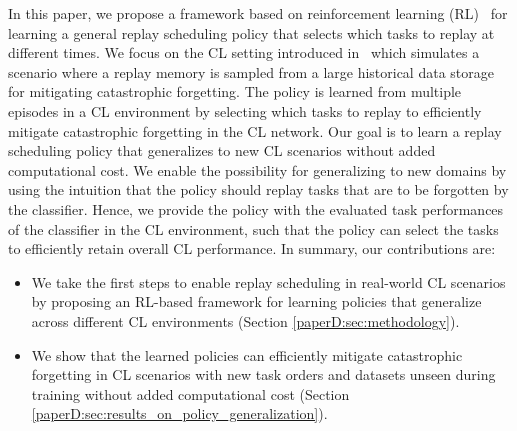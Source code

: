 In this paper, we propose a framework based on reinforcement learning (RL)~ for learning a general replay scheduling policy that selects which tasks to replay at different times. We focus on the CL setting introduced in~ which simulates a scenario where a replay memory is sampled from a large historical data storage for mitigating catastrophic forgetting. The policy is learned from multiple episodes in a CL environment by selecting which tasks to replay to efficiently mitigate catastrophic forgetting in the CL network. 
Our goal is to learn a replay scheduling policy that generalizes to new CL scenarios without added computational cost. 
We enable the possibility for generalizing to new domains by using the intuition that the policy should replay tasks that are to be forgotten by the classifier. Hence, we provide the policy with the evaluated task performances of the classifier in the CL environment, such that the policy can select the tasks to efficiently retain overall CL performance.  
In summary, our contributions are:
\begin{itemize}[topsep=1pt,] %
	\item We take the first steps to enable replay scheduling in real-world CL scenarios by proposing an RL-based framework for learning policies that generalize across different CL environments (Section \ref{paperD:sec:methodology}). 
	\item We show that the learned policies can efficiently mitigate catastrophic forgetting in CL scenarios with new task orders and datasets unseen during training without added computational cost (Section \ref{paperD:sec:results_on_policy_generalization}).
\end{itemize}
